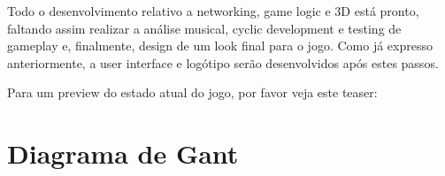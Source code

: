 \documentclass{article}
\begin{document}
Todo o desenvolvimento relativo a networking, game logic e 3D está pronto, faltando assim realizar a análise musical, cyclic development e testing de gameplay e, finalmente, design de um look final para o jogo. Como já expresso anteriormente, a user interface e logótipo serão desenvolvidos após estes passos.

Para um preview do estado atual do jogo, por favor veja este teaser: 

\section{Diagrama de Gant}
\end{document}
